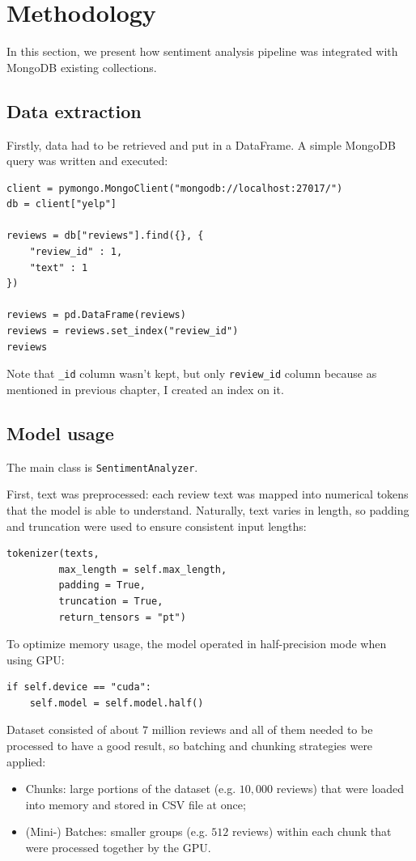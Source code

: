 \documentclass{Configuration_Files/PoliMi3i_thesis}
\begin{document}
\section{Methodology}
In this section, we present how sentiment analysis pipeline was integrated with MongoDB existing collections. 

\subsection{Data extraction}
Firstly, data had to be retrieved and put in a DataFrame. A simple MongoDB query was written and executed:

\bigskip

\begin{verbatim}
client = pymongo.MongoClient("mongodb://localhost:27017/")
db = client["yelp"]

reviews = db["reviews"].find({}, {
    "review_id" : 1,
    "text" : 1
})

reviews = pd.DataFrame(reviews)
reviews = reviews.set_index("review_id")
reviews
\end{verbatim}

\bigskip

Note that \texttt{\_id} column wasn't kept, but only \texttt{review\_id} column because as mentioned in previous chapter, I created an index on it.  

\subsection{Model usage}
The main class is \texttt{SentimentAnalyzer}.

First, text was preprocessed: each review text was mapped into numerical tokens that the model is able to understand. Naturally, text varies in length, so padding and truncation were used to ensure consistent input lengths:

\begin{verbatim}
tokenizer(texts, 
         max_length = self.max_length, 
         padding = True, 
         truncation = True, 
         return_tensors = "pt")
\end{verbatim}

To optimize memory usage, the model operated in half-precision mode when using GPU:
\begin{verbatim}
if self.device == "cuda":
    self.model = self.model.half()
\end{verbatim}

Dataset consisted of about $7$ million reviews and all of them needed to be processed to have a good result, so batching and chunking strategies were applied:
\begin{itemize}
    \item Chunks: large portions of the dataset (e.g. $10,000$ reviews) that were loaded into memory and stored in CSV file at once;
    \item (Mini-) Batches: smaller groups (e.g. $512$ reviews) within each chunk that were processed together by the GPU.
\end{itemize}
\end{document}
